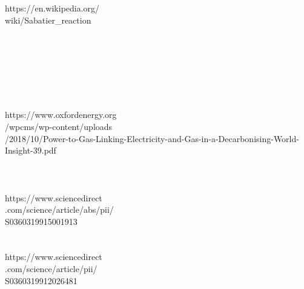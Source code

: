 \begin{parcolumns}[colwidths={1=2.5 cm, 2=10 cm, 3=2.5 cm}]{3}
{https://en.wikipedia.org/\\wiki/Sabatier\_reaction
\\ \\ \\ \\ \\ \\ \\ \\
https://www.oxfordenergy.org\\/wpcms/wp-content/uploads\\/2018/10/Power-to-Gas-Linking-Electricity-and-Gas-in-a-Decarbonising-World-Insight-39.pdf
\\ \\ \\ \\
https://www.sciencedirect\\.com/science/article/abs/pii/\\S0360319915001913
\\ \\ \\
https://www.sciencedirect\\.com/science/article/pii/\\S0360319912026481
}
\end{parcolumns}
